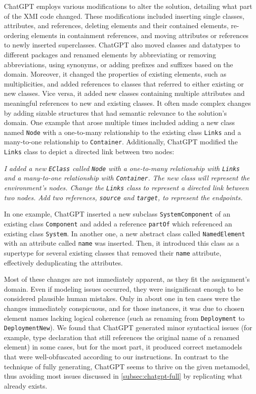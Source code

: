 ChatGPT employs various modifications to alter the solution, detailing what part of the \ac{XMI} code changed.
These modifications included inserting single classes, attributes, and references, deleting elements and their contained elements, re-ordering elements in containment references, and moving attributes or references to newly inserted superclasses. ChatGPT also moved classes and datatypes to different packages and renamed elements by abbreviating or removing abbreviations, using synonyms, or adding prefixes and suffixes based on the domain. Moreover, it changed the properties of existing elements, such as multiplicities, and added references to classes that referred to either existing or new classes. Vice versa, it added new classes containing multiple attributes and meaningful references to new and existing classes.
%
It often made complex changes by adding sizable structures that had semantic relevance to the solution's domain.
One example that arose multiple times included adding a new class named \texttt{Node} with a one-to-many relationship to the existing class \texttt{Links} and a many-to-one relationship to \texttt{Container}. Additionally, ChatGPT modified the \texttt{Links} class to depict a directed link between two nodes:
%
\begin{myquote}
     \textit{I added a new \texttt{EClass} called \texttt{Node} with a one-to-many relationship with \texttt{Links} and a many-to-one relationship with \texttt{Container}. The new class will represent the environment's nodes. Change the \texttt{Links} class to represent a directed link between two nodes. Add two references, \texttt{source} and \texttt{target}, to represent the endpoints.}
\end{myquote}

\noindent
In one example, ChatGPT inserted a new subclass \texttt{SystemComponent} of an existing class \texttt{Component} and added a reference \texttt{partOf} which referenced an existing class \texttt{System}.
In another one, a new abstract class called \texttt{NamedElement} with an attribute called \texttt{name} was inserted.
Then, it introduced this class as a supertype for several existing classes that removed their \texttt{name} attribute, effectively deduplicating the attributes.


Most of these changes are not immediately apparent, as they fit the assignment's domain.
Even if modeling issues occurred, they were insignificant enough to be considered plausible human mistakes.
Only in about one in ten cases were the changes immediately conspicuous, and for those instances, it was due to chosen element names lacking logical coherence (such as renaming from \texttt{Deployment} to \texttt{DeploymentNew}).
%
We found that ChatGPT generated minor syntactical issues (for example, type declaration that still references the original name of a renamed element) in some cases, but for the most part, it produced correct metamodels that were well-obfuscated according to our instructions.
In contrast to the technique of fully generating, ChatGPT seems to thrive on the given metamodel, thus avoiding most issues discussed in \autoref{subsec:chatgpt-full} by replicating what already exists.

